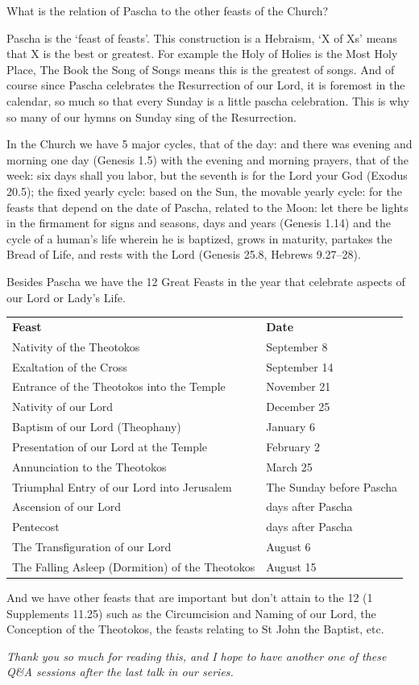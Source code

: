 \documentclass[
]{article}
\begin{document}
What is the relation of Pascha to the other feasts of the Church?

Pascha is the `feast of feasts'. This construction is a Hebraism, `X of
Xs' means that X is the best or greatest. For example the Holy of Holies
is the Most Holy Place, The Book the Song of Songs means this is the
greatest of songs. And of course since Pascha celebrates the
Resurrection of our Lord, it is foremost in the calendar, so much so
that every Sunday is a little pascha celebration. This is why so many of
our hymns on Sunday sing of the Resurrection.

In the Church we have 5 major cycles, that of the day: and there was
evening and morning one day (Genesis 1.5) with the evening and morning
prayers, that of the week: six days shall you labor, but the seventh is
for the Lord your God (Exodus 20.5); the fixed yearly cycle: based on
the Sun, the movable yearly cycle: for the feasts that depend on the
date of Pascha, related to the Moon: let there be lights in the
firmament for signs and seasons, days and years (Genesis 1.14) and the
cycle of a human's life wherein he is baptized, grows in maturity,
partakes the Bread of Life, and rests with the Lord (Genesis 25.8,
Hebrews 9.27--28).

Besides Pascha we have the 12 Great Feasts in the year that celebrate
aspects of our Lord or Lady's Life.

\begin{longtable}[]{@{}
  >{\raggedright\arraybackslash}p{}
  >{\raggedright\arraybackslash}p{}@{}}
\toprule\noalign{}
\endhead
\bottomrule\noalign{}
\endlastfoot
\textbf{Feast} & \textbf{Date} \\
Nativity of the Theotokos & September 8 \\
Exaltation of the Cross & September 14 \\
Entrance of the Theotokos into the Temple & November 21 \\
Nativity of our Lord & December 25 \\
Baptism of our Lord (Theophany) & January 6 \\
Presentation of our Lord at the Temple & February 2 \\
Annunciation to the Theotokos & March 25 \\
Triumphal Entry of our Lord into Jerusalem & The Sunday before Pascha \\
Ascension of our Lord & 40 days after Pascha \\
Pentecost & 50 days after Pascha \\
The Transfiguration of our Lord & August 6 \\
The Falling Asleep (Dormition) of the Theotokos & August 15 \\
\end{longtable}

And we have other feasts that are important but don't attain to the 12
(1 Supplements 11.25) such as the Circumcision and Naming of our Lord,
the Conception of the Theotokos, the feasts relating to St John the
Baptist, etc.

\emph{Thank you so much for reading this, and I hope to have another one
of these Q\&A sessions after the last talk in our series.}
\end{document}
